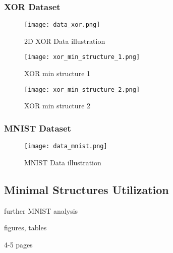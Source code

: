 \subsubsection*{XOR Dataset}

\begin{figure}[H]
  \centering
  \texttt{[image: data\_xor.png]}
  \caption{2D XOR Data illustration}
  \label{img:data_xor}
\end{figure}

\begin{figure}[H]
  \centering
  \texttt{[image: xor\_min\_structure\_1.png]}
  \caption{XOR min structure 1}
  \label{img:xor_min_structure_1}
\end{figure}

\begin{figure}[H]
  \centering
  \texttt{[image: xor\_min\_structure\_2.png]}
  \caption{XOR min structure 2}
  \label{img:xor_min_structure_2}
\end{figure}

\subsubsection*{MNIST Dataset}

\begin{figure}[H]
  \centering
  \texttt{[image: data\_mnist.png]}
  \caption{MNIST Data illustration}
  \label{img:data_mnist}
\end{figure}

\subsection{Minimal Structures Utilization}
further MNIST analysis

figures, tables

4-5 pages